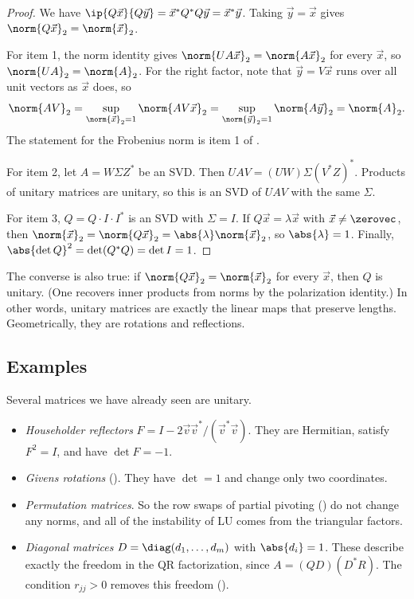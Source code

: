 \begin{proof}
  We have $\ip{Q\vec{x}}{Q\vec{y}} = \vec{x}^\ast Q^\ast Q\vec{y} = \vec{x}^\ast\vec{y}$. Taking $\vec{y} = \vec{x}$ gives $\norm{Q\vec{x}}_2 = \norm{\vec{x}}_2$.

  For item 1, the norm identity gives $\norm{UA\vec{x}}_2 = \norm{A\vec{x}}_2$ for every $\vec{x}$, so $\norm{UA}_2 = \norm{A}_2$. For the right factor, note that $\vec{y} = V\vec{x}$ runs over all unit vectors as $\vec{x}$ does, so
  \begin{equation}
    \norm{AV}_2 = \sup_{\norm{\vec{x}}_2 = 1}\norm{AV\vec{x}}_2 = \sup_{\norm{\vec{y}}_2 = 1}\norm{A\vec{y}}_2 = \norm{A}_2.
  \end{equation}
  The statement for the Frobenius norm is item 1 of .

  For item 2, let $A = W\Sigma Z^\ast$ be an SVD. Then $UAV = (UW)\Sigma(V^\ast Z)^\ast$. Products of unitary matrices are unitary, so this is an SVD of $UAV$ with the same $\Sigma$.

  For item 3, $Q = Q \cdot I \cdot I^\ast$ is an SVD with $\Sigma = I$. If $Q\vec{x} = \lambda\vec{x}$ with $\vec{x} \ne \zerovec$, then $\norm{\vec{x}}_2 = \norm{Q\vec{x}}_2 = \abs{\lambda}\norm{\vec{x}}_2$, so $\abs{\lambda} = 1$. Finally, $\abs{\det Q}^2 = \det(Q^\ast Q) = \det I = 1$.
\end{proof}

The converse is also true: if $\norm{Q\vec{x}}_2 = \norm{\vec{x}}_2$ for every $\vec{x}$, then $Q$ is unitary. (One recovers inner products from norms by the polarization identity.) In other words, unitary matrices are exactly the linear maps that preserve lengths. Geometrically, they are rotations and reflections.

\subsection{Examples}

Several matrices we have already seen are unitary.
\begin{itemize}
  \item \emph{Householder reflectors} $F = I - 2\vec{v}\vec{v}^\ast/(\vec{v}^\ast\vec{v})$. They are Hermitian, satisfy $F^2 = I$, and have $\det F = -1$.
  \item \emph{Givens rotations} (). They have $\det = 1$ and change only two coordinates.
  \item \emph{Permutation matrices}. So the row swaps of partial pivoting () do not change any norms, and all of the instability of LU comes from the triangular factors.
  \item \emph{Diagonal matrices} $D = \diag(d_1, \dots, d_m)$ with $\abs{d_i} = 1$. These describe exactly the freedom in the QR factorization, since $A = (QD)(D^\ast R)$. The condition $r_{jj} > 0$ removes this freedom ().
\end{itemize}

